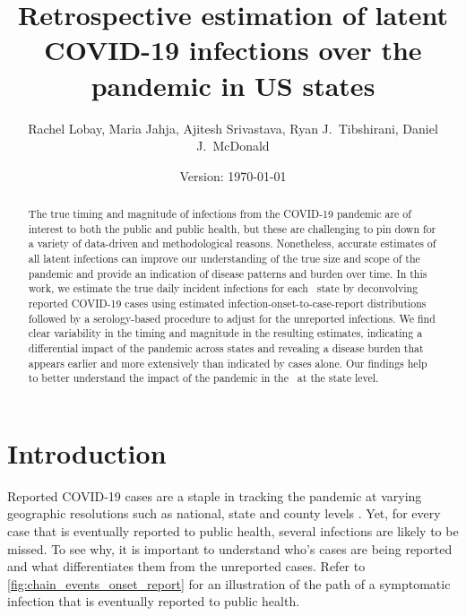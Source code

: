 \documentclass{article}
\begin{document}
\title{Retrospective estimation of latent COVID-19 infections over the pandemic in US states}
\author{Rachel Lobay, Maria Jahja, Ajitesh Srivastava, Ryan J.\ Tibshirani, Daniel J.\ McDonald}
\date{Version: \today}
\maketitle

\begin{abstract}
The true timing and magnitude of infections from the COVID-19 pandemic are of
interest to both the public and public health, but these are challenging to pin
down for a variety of data-driven and methodological reasons. Nonetheless, 
accurate estimates
of all latent infections can improve our understanding of the true size and
scope of the pandemic and provide an indication of disease patterns and burden
over time. In this work, we estimate the true daily incident infections for each
\US\ state by deconvolving reported COVID-19 cases using estimated
infection-onset-to-case-report distributions followed by a serology-based
procedure to adjust for the unreported infections. We find clear
variability in the timing and magnitude in the resulting estimates, indicating a
differential impact of the pandemic across states and revealing a disease burden
that appears earlier and more extensively than indicated by cases alone. Our
findings help to better understand the impact of the pandemic in the \US\ at the state level.
\end{abstract}

\section{Introduction}

Reported COVID-19 cases are a staple in tracking the pandemic at varying
geographic resolutions such as national, state and county levels
\citep{dong2020interactive, nyt2020corona, wp2020tracking}. Yet, for every case
that is eventually reported to public health, several infections are likely to
be missed. To see why, it is important to understand who's cases are being reported and
 what differentiates them from the unreported cases. Refer to
\autoref{fig:chain_events_onset_report} for an illustration of the path of a
symptomatic infection that is eventually reported to public health. 
\end{document}
